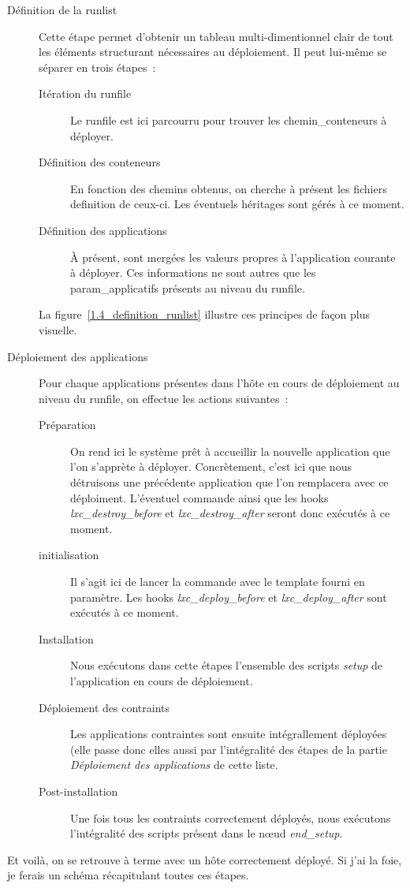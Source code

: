 \begin{description}
	\item[Définition de la \gls{runlist}]
		Cette étape permet d'obtenir un tableau multi-dimentionnel clair de tout les éléments structurant nécessaires au déploiement.
		Il peut lui-même se séparer en trois étapes~:
		\begin{description}
			\item[Itération du \gls{runfile}]
				Le runfile est ici parcourru pour trouver les \glspl{chemin_conteneur} à déployer.
			\item[Définition des conteneurs]
				En fonction des chemins obtenus, on cherche à présent les fichiers \gls{definition} de ceux-ci.
				Les éventuels héritages sont gérés à ce moment.
			\item[Définition des applications]
				À présent, sont mergées les valeurs propres à l'application courante à déployer.
				Ces informations ne sont autres que les \gls{param_applicatifs} présents au niveau du runfile.
		\end{description}
		La figure~\ref{1.4_definition_runlist} illustre ces principes de façon plus visuelle.
	\item[Déploiement des applications]
		Pour chaque applications présentes dans l'hôte en cours de déploiement au niveau du runfile, on effectue les actions suivantes~:
			\begin{description}
				\item[Préparation]
					On rend ici le système prêt à accueillir la nouvelle application que l'on s'apprète à déployer.
					Concrètement, c'est ici que nous détruisons une précédente application que l'on remplacera avec ce déploiment.
					L'éventuel commande  ainsi que les hooks \emph{lxc\_destroy\_before} et \emph{lxc\_destroy\_after} seront donc exécutés à ce moment.
				\item[\Gls{initialisation}]
					Il s'agit ici de lancer la commande  avec le template fourni en paramètre.
					Les hooks \emph{lxc\_deploy\_before} et \emph{lxc\_deploy\_after} sont exécutés à ce moment.
				\item[Installation]
					Nous exécutons dans cette étapes l'ensemble des scripts \emph{setup} de l'application en cours de déploiement.
				\item[Déploiement des contraints]
					Les applications \gls{contraint}es sont ensuite intégrallement déployées (elle passe donc elles aussi par l'intégralité des étapes de la partie \emph{Déploiement des applications} de cette liste.
				\item[Post-installation]
					Une fois tous les contraints correctement déployés, nous exécutons l'intégralité des scripts présent dans le nœud \emph{end\_setup}.
			\end{description}
\end{description}
Et voilà, on se retrouve à terme avec un hôte correctement déployé.
Si j'ai la foie, je ferais un schéma récapitulant toutes ces étapes.

